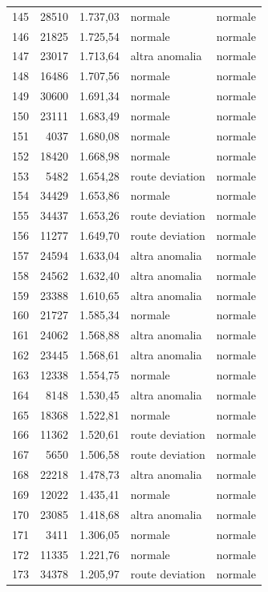 {\begin{longtable}{rrrll}
145 & 28510 & 1.737,03 & normale & normale \\
146 & 21825 & 1.725,54 & normale & normale \\
147 & 23017 & 1.713,64 & altra anomalia & normale \\
148 & 16486 & 1.707,56 & normale & normale \\
149 & 30600 & 1.691,34 & normale & normale \\
150 & 23111 & 1.683,49 & normale & normale \\
151 & 4037 & 1.680,08 & normale & normale \\
152 & 18420 & 1.668,98 & normale & normale \\
153 & 5482 & 1.654,28 & route deviation & normale \\
154 & 34429 & 1.653,86 & normale & normale \\
155 & 34437 & 1.653,26 & route deviation & normale \\
156 & 11277 & 1.649,70 & route deviation & normale \\
157 & 24594 & 1.633,04 & altra anomalia & normale \\
158 & 24562 & 1.632,40 & altra anomalia & normale \\
159 & 23388 & 1.610,65 & altra anomalia & normale \\
160 & 21727 & 1.585,34 & normale & normale \\
161 & 24062 & 1.568,88 & altra anomalia & normale \\
162 & 23445 & 1.568,61 & altra anomalia & normale \\
163 & 12338 & 1.554,75 & normale & normale \\
164 & 8148 & 1.530,45 & altra anomalia & normale \\
165 & 18368 & 1.522,81 & normale & normale \\
166 & 11362 & 1.520,61 & route deviation & normale \\
167 & 5650 & 1.506,58 & route deviation & normale \\
168 & 22218 & 1.478,73 & altra anomalia & normale \\
169 & 12022 & 1.435,41 & normale & normale \\
170 & 23085 & 1.418,68 & altra anomalia & normale \\
171 & 3411 & 1.306,05 & normale & normale \\
172 & 11335 & 1.221,76 & normale & normale \\
173 & 34378 & 1.205,97 & route deviation & normale \\

\end{longtable}}
